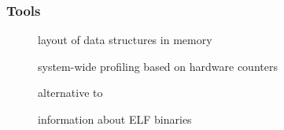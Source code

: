 \begin{frame}
 \frametitle{Tools}
 \begin{description}
  \item[] layout of data structures in memory
  \item[] system-wide profiling based on hardware counters
  \item[] alternative to 
  \item[] information about ELF binaries
 \end{description}
\end{frame}
